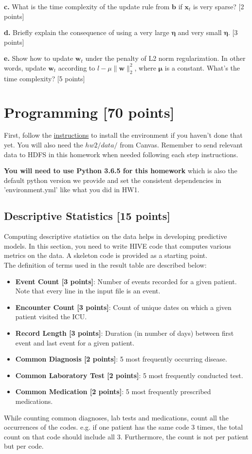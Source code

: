 \documentclass[12pt]{article}
\begin{document}
\textbf{c.} What is the time complexity of the update rule from $\mathbf{b}$ if $\mathbf{x}_t$ is very sparse? [2 points]

\textbf{d.} Briefly explain the consequence of using a very large $\mathbf{\eta}$ and very small $\mathbf{\eta}$. [3 points]

\textbf{e.} Show how to update $\mathbf{w}_t$ under the penalty of L2 norm regularization. In other words, update $\mathbf{w}_t$ according to $l - \mu \|\mathbf{w}\|_2^2 $, where $\mathbf{\mu}$ is a constant. What's the time complexity? [5 points]

\section{Programming [70 points]}
First, follow the \href{http://www.sunlab.org/teaching/cse6250/fall2018/env/}{instructions} to install the environment if you haven't done that yet. You will also need the $hw2/data/$ from Canvas. Remember to send relevant data to HDFS in this homework when needed following each step instructions.

\textbf{You will need to use Python 3.6.5 for this homework} which is also the default python version we provide and set the consistent dependencies in 'environment.yml' like what you did in HW1. 


\subsection{Descriptive Statistics [15 points]}
Computing descriptive statistics on the data helps in developing predictive models. In this section, you need to write HIVE code that computes various metrics on the data. A skeleton code is provided as a starting point. \\

The definition of terms used in the result table are described below:
\begin{itemize}
\item \textbf{Event Count [3 points]}: Number of events recorded for a given patient. Note that every line in the input file is an event. 
\item \textbf{Encounter Count [3 points]}: Count of unique dates on which a given patient visited the ICU.
\item \textbf{Record Length [3 points]}: Duration (in number of days) between first event and last event for a given patient.
\item \textbf{Common Diagnosis [2 points]}: 5 most frequently occurring disease.
\item \textbf{Common Laboratory Test [2 points]}: 5 most frequently conducted test.
\item \textbf{Common Medication [2 points]}: 5 most frequently prescribed medications.
\end{itemize}
While counting common diagnoses, lab tests and medications, count all the occurrences of the codes. e.g. if one patient has the same code 3 times, the total count on that code should include all 3. Furthermore, the count is not per patient but per code.
\end{document}
